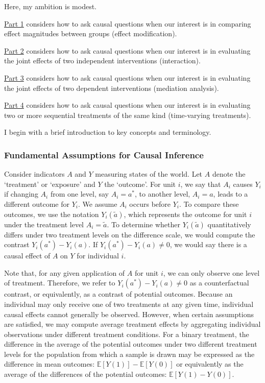 \documentclass[
  single column]{article}
\begin{document}
Here, my ambition is modest.

\hyperref[id-sec-1]{Part 1} considers how to ask causal questions when
our interest is in comparing effect magnitudes between groups (effect
modification).

\hyperref[id-sec-2]{Part 2} considers how to ask causal questions when
our interest is in evaluating the joint effects of two independent
interventions (interaction).

\hyperref[id-sec-3]{Part 3} considers how to ask causal questions when
our interest is in evaluating the joint effects of two dependent
interventions (mediation analysis).

\hyperref[id-sec-4]{Part 4} considers how to ask causal questions when
our interest is in evaluating two or more sequential treatments of the
same kind (time-varying treatments).

I begin with a brief introduction to key concepts and terminology.

\subsubsection{Fundamental Assumptions for Causal
Inference}\label{fundamental-assumptions-for-causal-inference}

Consider indicators \(A\) and \(Y\) measuring states of the world. Let
\(A\) denote the `treatment' or `exposure' and \(Y\) the `outcome'. For
unit \(i\), we say that \(A_i\) causes \(Y_i\) if changing \(A_i\) from
one level, say \(A_i = a^*\), to another level, \(A_i = a\), leads to a
different outcome for \(Y_i\). We assume \(A_i\) occurs before \(Y_i\).
To compare these outcomes, we use the notation \(Y_i(\tilde{a})\), which
represents the outcome for unit \(i\) under the treatment level
\(A_i = \tilde{a}\). To determine whether \(Y_i(\tilde{a})\)
quantitatively differs under two treatment levels on the difference
scale, we would compute the contrast \(Y_i(a^*) - Y_i(a)\). If
\(Y_i(a^*) - Y_i(a) \neq 0\), we would say there is a causal effect of
\(A\) on \(Y\) for individual \(i\).

Note that, for any given application of \(A\) for unit \(i\), we can
only observe one level of treatment. Therefore, we refer to
\(Y_i(a^*) - Y_i(a) \neq 0\) as a counterfactual contrast, or
equivalently, as a contrast of potential outcomes. Because an individual
may only receive one of two treatments at any given time, individual
causal effects cannot generally be observed. However, when certain
assumptions are satisfied, we may compute average treatment effects by
aggregating individual observations under different treatment
conditions. For a binary treatment, the difference in the average of the
potential outcomes under two different treatment levels for the
population from which a sample is drawn may be expressed as the
difference in mean outcomes: \(\mathbb{E}[Y(1)] - \mathbb{E}[Y(0)]\) or
equivalently as the average of the differences of the potential
outcomes: \(\mathbb{E}[Y(1) - Y(0)]\).
\end{document}
